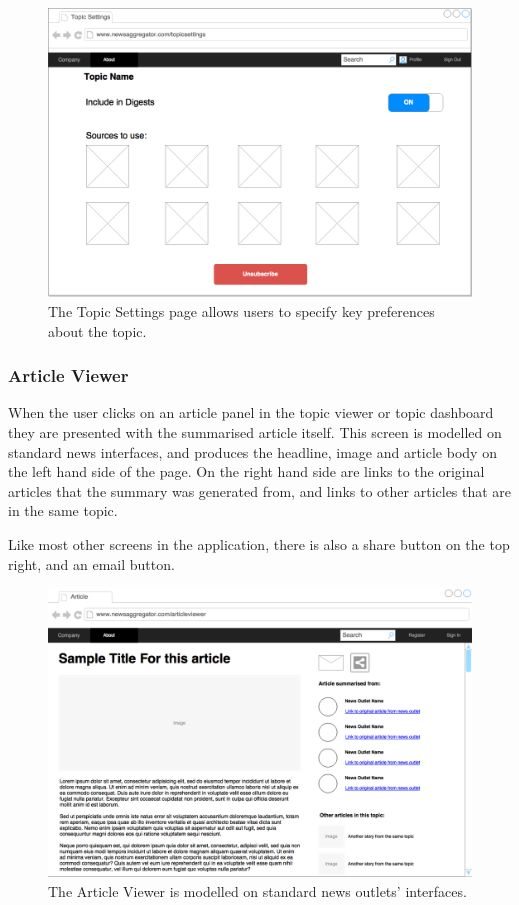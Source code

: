 \documentclass[12pt]{article}
\begin{document}
\begin{figure}[ht!]
  \centering
    \includegraphics[scale=0.3]{TopicSettings.png}
   \caption[A wireframe of the Topic Settings page]{The Topic Settings page allows users to specify key preferences about the topic.}
   \label{topicSettings}
\end{figure}

\subsubsection{Article Viewer}

When the user clicks on an article panel in the topic viewer or topic dashboard they are presented with the summarised article itself. This screen is modelled on standard news interfaces, and produces the headline, image and article body on the left hand side of the page. On the right hand side are links to the original articles that the summary was generated from, and links to other articles that are in the same topic. 

Like most other screens in the application, there is also a share button on the top right, and an email button.

\begin{figure}[ht!]
  \centering
    \includegraphics[scale=0.3]{ArticleViewer.png}
   \caption[A wireframe of the Article Viewer]{The Article Viewer is modelled on standard news outlets' interfaces.}
   \label{articleViewer}
\end{figure}
\end{document}
